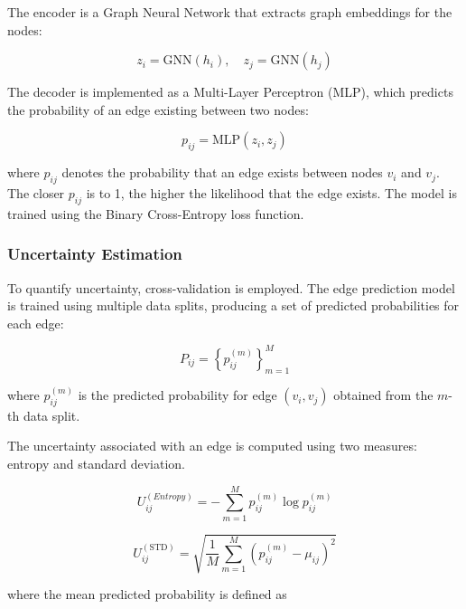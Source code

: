 \documentclass{article}
\begin{document}
The encoder is a Graph Neural Network that extracts graph embeddings for the nodes:

\begin{equation}
z_i = \mathrm{GNN}(h_i),
\quad
z_j = \mathrm{GNN}(h_j)
\label{eq:gnn_embeddings_pair}
\end{equation}

The decoder is implemented as a Multi-Layer Perceptron (MLP), which predicts the probability of an edge existing between two nodes:

\begin{equation}
p_{ij} = \mathrm{MLP}(z_i, z_j)
\label{eq:edge_probability}
\end{equation}

where \( p_{ij} \) denotes the probability that an edge exists between nodes \( v_i \) and \( v_j \). The closer \( p_{ij} \) is to 1, the higher the likelihood that the edge exists. The model is trained using the Binary Cross-Entropy loss function.

\subsubsection{Uncertainty Estimation}

To quantify uncertainty, cross-validation is employed. The edge prediction model is trained using multiple data splits, producing a set of predicted probabilities for each edge:

\begin{equation}
P_{ij} = \left\{ p_{ij}^{(m)} \right\}_{m=1}^{M}
\label{eq:probability_set}
\end{equation}

where \( p_{ij}^{(m)} \) is the predicted probability for edge \((v_i, v_j)\) obtained from the \(m\)-th data split.

The uncertainty associated with an edge is computed using two measures: entropy and standard deviation.

\begin{equation}
U_{ij}^{(Entropy)} = - \sum_{m=1}^{M} p_{ij}^{(m)} \log p_{ij}^{(m)}
\label{eq:entropy_uncertainty}
\end{equation}

\begin{equation}
U_{ij}^{(\mathrm{STD})}=\sqrt{\frac{1}{M}\sum_{m=1}^{M}\left(p_{ij}^{(m)} - \mu_{ij}\right)^2}
\label{eq:std_uncertainty_full}
\end{equation}

where the mean predicted probability is defined as
\end{document}
